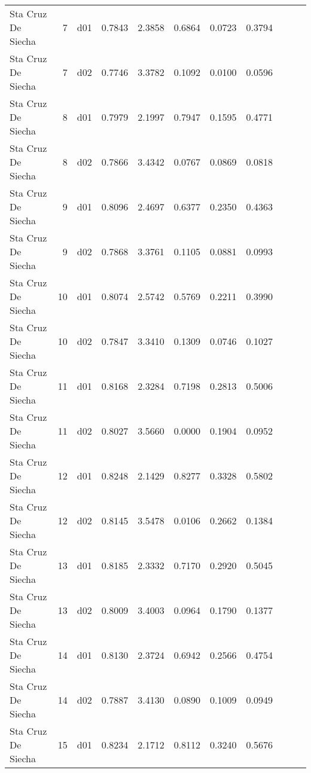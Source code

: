 \begin{landscape}
\begin{longtable}{p{2cm}rrrrrrrrrr}
      Sta Cruz De Siecha  &          7 &     d01 &   0.7843 &  2.3858 &        0.6864 &           0.0723 &  0.3794 \\
      Sta Cruz De Siecha  &          7 &     d02 &   0.7746 &  3.3782 &        0.1092 &           0.0100 &  0.0596 \\
      Sta Cruz De Siecha  &          8 &     d01 &   0.7979 &  2.1997 &        0.7947 &           0.1595 &  0.4771 \\
      Sta Cruz De Siecha  &          8 &     d02 &   0.7866 &  3.4342 &        0.0767 &           0.0869 &  0.0818 \\
      Sta Cruz De Siecha  &          9 &     d01 &   0.8096 &  2.4697 &        0.6377 &           0.2350 &  0.4363 \\
      Sta Cruz De Siecha  &          9 &     d02 &   0.7868 &  3.3761 &        0.1105 &           0.0881 &  0.0993 \\
      Sta Cruz De Siecha  &         10 &     d01 &   0.8074 &  2.5742 &        0.5769 &           0.2211 &  0.3990 \\
      Sta Cruz De Siecha  &         10 &     d02 &   0.7847 &  3.3410 &        0.1309 &           0.0746 &  0.1027 \\
      Sta Cruz De Siecha  &         11 &     d01 &   0.8168 &  2.3284 &        0.7198 &           0.2813 &  0.5006 \\
      Sta Cruz De Siecha  &         11 &     d02 &   0.8027 &  3.5660 &        0.0000 &           0.1904 &  0.0952 \\
      Sta Cruz De Siecha  &         12 &     d01 &   0.8248 &  2.1429 &        0.8277 &           0.3328 &  0.5802 \\
      Sta Cruz De Siecha  &         12 &     d02 &   0.8145 &  3.5478 &        0.0106 &           0.2662 &  0.1384 \\
      Sta Cruz De Siecha  &         13 &     d01 &   0.8185 &  2.3332 &        0.7170 &           0.2920 &  0.5045 \\
      Sta Cruz De Siecha  &         13 &     d02 &   0.8009 &  3.4003 &        0.0964 &           0.1790 &  0.1377 \\
      Sta Cruz De Siecha  &         14 &     d01 &   0.8130 &  2.3724 &        0.6942 &           0.2566 &  0.4754 \\
      Sta Cruz De Siecha  &         14 &     d02 &   0.7887 &  3.4130 &        0.0890 &           0.1009 &  0.0949 \\
      Sta Cruz De Siecha  &         15 &     d01 &   0.8234 &  2.1712 &        0.8112 &           0.3240 &  0.5676 \\

\end{longtable}
\end{landscape}
